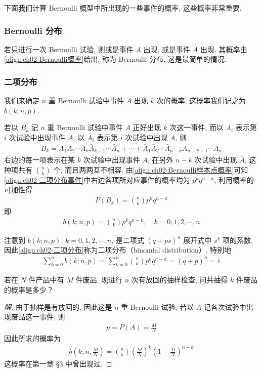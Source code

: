 \documentclass[../../main.tex]{subfiles}
\begin{document}
下面我们计算 Bernoulli 概型中所出现的一些事件的概率, 这些概率非常重要.

\subsubsection{Bernoulli 分布}

若只进行一次 Bernoulli 试验, 则或是事件 $A$ 出现, 或是事件 $\bar{A}$ 出现, 其概率由\eqref{align:ch02-Bernoulli概率}给出, 称为 Bernoulli 分布, 这是最简单的情况.

\subsubsection{二项分布}

我们来确定 $n$ 重 Bernoulli 试验中事件 $A$ 出现 $k$ 次的概率, 这概率我们记之为 $b(k;n,p)$.

若以 $B_k$ 记 $n$ 重 Bernoulli 试验中事件 $A$ 正好出现 $k$ 次这一事件, 而以 $A_i$ 表示第 $i$ 次试验中出现事件 $A$, 以 $\bar{A}_i$ 表示第 $i$ 次试验中出现 $\bar{A}$, 则
\begin{align}\label{align:ch02-二项分布事件}
B_k=A_1A_2\cdots A_k\bar{A}_{k+1}\cdots\bar{A}_n+\cdots+\bar{A}_1\bar{A}_2\cdots\bar{A}_{n-k}A_{n-k+1}\cdots A_n
\end{align}
右边的每一项表示在某 $k$ 次试验中出现事件 $A$, 在另外 $n-k$ 次试验中出现 $\bar{A}$, 这种项共有 $\binom{n}{k}$ 个, 而且两两互不相容. 由\eqref{align:ch02-Bernoulli样本点概率}可知\eqref{align:ch02-二项分布事件}中右边各项所对应事件的概率均为 $p^k q^{n-k}$, 利用概率的可加性得
\begin{align*}
P(B_k)=\binom{n}{k}p^k q^{n-k}
\end{align*}
即
\begin{align}\label{align:ch02-二项分布}
b(k;n,p)=\binom{n}{k}p^k q^{n-k},\quad k=0,1,2,\cdots,n
\end{align}

注意到 $b(k;n,p)$, $k=0,1,2,\cdots,n$, 是二项式 $(q+ps)^n$ 展开式中 $s^k$ 项的系数, 因此\eqref{align:ch02-二项分布}称为二项分布（binomial distribution）. 特别地
\begin{align}\label{align:ch02-二项分布归一化}
\sum_{k=0}^{n} b(k;n,p)=\sum_{k=0}^{n} \binom{n}{k}p^k q^{n-k}=(q+p)^n=1
\end{align}

\begin{example}[有放回抽样中的废品数]\label{example:ch02-有放回抽样废品数}
若在 $N$ 件产品中有 $M$ 件废品, 现进行 $n$ 次有放回的抽样检查, 问共抽得 $k$ 件废品的概率是多少？

\begin{proof}[解]
由于抽样是有放回的, 因此这是 $n$ 重 Bernoulli 试验, 若以 $A$ 记各次试验中出现废品这一事件, 则
\begin{align*}
p=P(A)=\frac{M}{N}
\end{align*}
因此所求的概率为
\begin{align*}
b\left(k;n,\frac{M}{N}\right)=\binom{n}{k}\left(\frac{M}{N}\right)^k\left(1-\frac{M}{N}\right)^{n-k}
\end{align*}
这概率在第一章 \S3 中曾出现过.
\end{proof}
\end{example}
\end{document}
